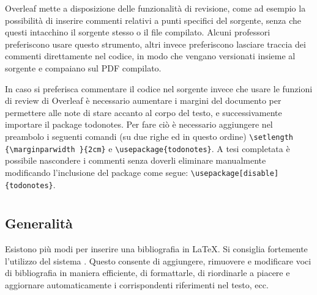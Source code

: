 \documentclass[12pt]{report}
\begin{document}
Overleaf mette a disposizione delle funzionalità di revisione, come ad esempio la possibilità di inserire commenti relativi a punti specifici del sorgente, senza che questi intacchino il sorgente stesso o il file compilato. Alcuni professori preferiscono usare questo strumento, altri invece preferiscono lasciare traccia dei commenti direttamente nel codice, in modo che vengano versionati insieme al sorgente e compaiano sul PDF compilato.

In caso si preferisca commentare il codice nel sorgente invece che usare le funzioni di review di Overleaf è necessario aumentare i margini del documento per permettere alle note di stare accanto al corpo del testo, e successivamente importare il package todonotes. Per fare ciò è necessario aggiungere nel preambolo i seguenti comandi (su due righe ed in questo ordine) \verb|\setlength {\marginparwidth }{2cm}| e \verb|\usepackage{todonotes}|. A tesi completata è possibile nascondere i commenti senza doverli eliminare manualmente modificando l'inclusione del package come segue: \verb|\usepackage[disable]{todonotes}|.


\section{}
\label{sec:bibtex}

\subsection{Generalit\`a}

Esistono più modi per inserire una bibliografia in \LaTeX. Si consiglia fortemente l'utilizzo del sistema . Questo consente di aggiungere, rimuovere e modificare voci di bibliografia in maniera efficiente, di formattarle, di riordinarle a piacere e aggiornare automaticamente i corrispondenti riferimenti nel testo, ecc.
\end{document}
